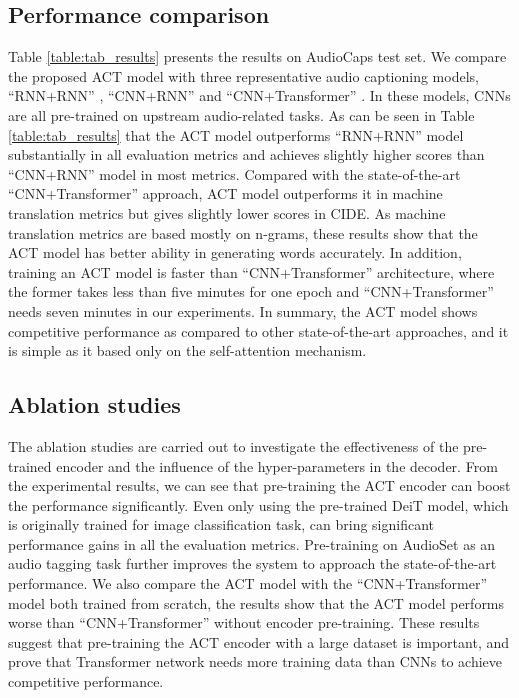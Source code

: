 \documentclass{article}
\begin{document}
\begin{sloppy}
\subsection{Performance comparison}
\label{ssec:comparison}
Table \ref{table:tab_results} presents the results on AudioCaps test set. We compare the proposed ACT model with three representative audio captioning models, ``RNN+RNN'' \cite{kim2019audiocaps}, ``CNN+RNN'' \cite{xu2021investigating} and ``CNN+Transformer'' \cite{xinhao2021_t6}. In these models, CNNs are all pre-trained on upstream audio-related tasks. As can be seen in Table \ref{table:tab_results} that the ACT model outperforms ``RNN+RNN'' model substantially in all evaluation metrics and achieves slightly higher scores than ``CNN+RNN'' model in most metrics. Compared with the state-of-the-art ``CNN+Transformer'' approach, ACT model outperforms it in machine translation metrics but gives slightly lower scores in CIDE. As machine translation metrics are based mostly on n-grams, these results show that the ACT model has better ability in generating words accurately. In addition, training an ACT model is faster than ``CNN+Transformer'' architecture, where the former takes less than five minutes for one epoch and ``CNN+Transformer'' needs seven minutes in our experiments. In summary, the ACT model shows competitive performance as compared to other state-of-the-art approaches, and it is simple as it based only on the self-attention mechanism.

\subsection{Ablation studies}
\label{ssec:ablation_studies}
The ablation studies are carried out to investigate the effectiveness of the pre-trained encoder and the influence of the hyper-parameters in the decoder. From the experimental results, we can see that pre-training the ACT encoder can boost the performance significantly. Even only using the pre-trained DeiT model, which is originally trained for image classification task, can bring significant performance gains in all the evaluation metrics. Pre-training on AudioSet as an audio tagging task further improves the system to approach the state-of-the-art performance. We also compare the ACT model with the ``CNN+Transformer'' model both trained from scratch, the results show that the ACT model performs worse than ``CNN+Transformer'' without encoder pre-training. These results suggest that pre-training the ACT encoder with a large dataset is important, and prove that Transformer network needs more training data than CNNs to achieve competitive performance. 


\end{sloppy}
\end{document}
